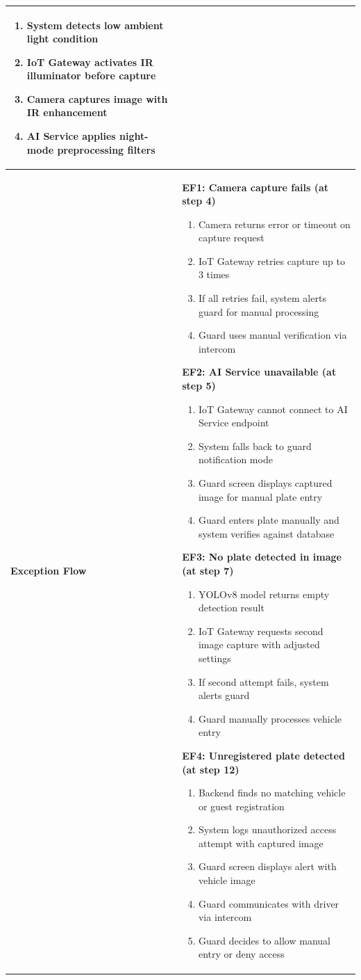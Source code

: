 \documentclass[a4paper]{article}
\newlength{\ucLeft}
\begin{document}
\begin{longtable}{|>{\bfseries}p{\ucLeft}|
                p{\dimexpr\textwidth-\ucLeft-4\tabcolsep-3\arrayrulewidth\relax}|}
\begin{enumerate}
    \item System detects low ambient light condition
    \item IoT Gateway activates IR illuminator before capture
    \item Camera captures image with IR enhancement
    \item AI Service applies night-mode preprocessing filters
\end{enumerate}
\\ \hline
Exception Flow &
\noindent \textbf{EF1: Camera capture fails (at step 4)}
\begin{enumerate}
    \item Camera returns error or timeout on capture request
    \item IoT Gateway retries capture up to 3 times
    \item If all retries fail, system alerts guard for manual processing
    \item Guard uses manual verification via intercom
\end{enumerate}

\noindent \textbf{EF2: AI Service unavailable (at step 5)}
\begin{enumerate}
    \item IoT Gateway cannot connect to AI Service endpoint
    \item System falls back to guard notification mode
    \item Guard screen displays captured image for manual plate entry
    \item Guard enters plate manually and system verifies against database
\end{enumerate}

\noindent \textbf{EF3: No plate detected in image (at step 7)}
\begin{enumerate}
    \item YOLOv8 model returns empty detection result
    \item IoT Gateway requests second image capture with adjusted settings
    \item If second attempt fails, system alerts guard
    \item Guard manually processes vehicle entry
\end{enumerate}

\noindent \textbf{EF4: Unregistered plate detected (at step 12)}
\begin{enumerate}
    \item Backend finds no matching vehicle or guest registration
    \item System logs unauthorized access attempt with captured image
    \item Guard screen displays alert with vehicle image
    \item Guard communicates with driver via intercom
    \item Guard decides to allow manual entry or deny access
\end{enumerate}


\end{longtable}
\end{document}
